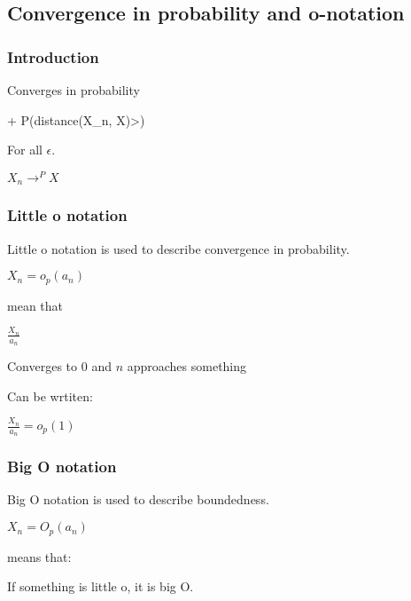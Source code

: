 
\subsection{Convergence in probability and o-notation}

\subsubsection{Introduction}

Converges in probability

+ P(distance(X_n, X)>\epsilon )

For all \(\epsilon \).

\(X_n \rightarrow^P X\)

\subsubsection{Little o notation}

Little o notation is used to describe convergence in probability.

\(X_n=o_p(a_n)\)

mean that

\(\frac{X_n}{a_n}\)

Converges to \(0\) and \(n\) approaches something

Can be wrtiten:

\(\frac{X_n}{a_n}=o_p(1)\)

\subsubsection{Big O notation}

Big O notation is used to describe boundedness.

\(X_n=O_p(a_n)\)

means that:

If something is little o, it is big O.

